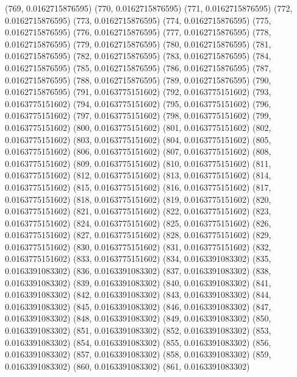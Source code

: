 {					(769, 0.0162715876595)
					(770, 0.0162715876595)
					(771, 0.0162715876595)
					(772, 0.0162715876595)
					(773, 0.0162715876595)
					(774, 0.0162715876595)
					(775, 0.0162715876595)
					(776, 0.0162715876595)
					(777, 0.0162715876595)
					(778, 0.0162715876595)
					(779, 0.0162715876595)
					(780, 0.0162715876595)
					(781, 0.0162715876595)
					(782, 0.0162715876595)
					(783, 0.0162715876595)
					(784, 0.0162715876595)
					(785, 0.0162715876595)
					(786, 0.0162715876595)
					(787, 0.0162715876595)
					(788, 0.0162715876595)
					(789, 0.0162715876595)
					(790, 0.0162715876595)
					(791, 0.0163775151602)
					(792, 0.0163775151602)
					(793, 0.0163775151602)
					(794, 0.0163775151602)
					(795, 0.0163775151602)
					(796, 0.0163775151602)
					(797, 0.0163775151602)
					(798, 0.0163775151602)
					(799, 0.0163775151602)
					(800, 0.0163775151602)
					(801, 0.0163775151602)
					(802, 0.0163775151602)
					(803, 0.0163775151602)
					(804, 0.0163775151602)
					(805, 0.0163775151602)
					(806, 0.0163775151602)
					(807, 0.0163775151602)
					(808, 0.0163775151602)
					(809, 0.0163775151602)
					(810, 0.0163775151602)
					(811, 0.0163775151602)
					(812, 0.0163775151602)
					(813, 0.0163775151602)
					(814, 0.0163775151602)
					(815, 0.0163775151602)
					(816, 0.0163775151602)
					(817, 0.0163775151602)
					(818, 0.0163775151602)
					(819, 0.0163775151602)
					(820, 0.0163775151602)
					(821, 0.0163775151602)
					(822, 0.0163775151602)
					(823, 0.0163775151602)
					(824, 0.0163775151602)
					(825, 0.0163775151602)
					(826, 0.0163775151602)
					(827, 0.0163775151602)
					(828, 0.0163775151602)
					(829, 0.0163775151602)
					(830, 0.0163775151602)
					(831, 0.0163775151602)
					(832, 0.0163775151602)
					(833, 0.0163775151602)
					(834, 0.0163391083302)
					(835, 0.0163391083302)
					(836, 0.0163391083302)
					(837, 0.0163391083302)
					(838, 0.0163391083302)
					(839, 0.0163391083302)
					(840, 0.0163391083302)
					(841, 0.0163391083302)
					(842, 0.0163391083302)
					(843, 0.0163391083302)
					(844, 0.0163391083302)
					(845, 0.0163391083302)
					(846, 0.0163391083302)
					(847, 0.0163391083302)
					(848, 0.0163391083302)
					(849, 0.0163391083302)
					(850, 0.0163391083302)
					(851, 0.0163391083302)
					(852, 0.0163391083302)
					(853, 0.0163391083302)
					(854, 0.0163391083302)
					(855, 0.0163391083302)
					(856, 0.0163391083302)
					(857, 0.0163391083302)
					(858, 0.0163391083302)
					(859, 0.0163391083302)
					(860, 0.0163391083302)
					(861, 0.0163391083302)
}
